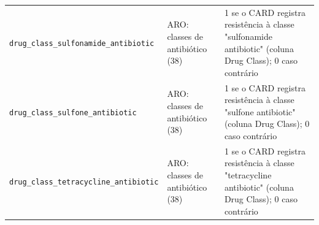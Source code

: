 \begin{longtable}{p{4.2cm}p{2.6cm}p{8cm}}
  \texttt{drug\_class\_sulfonamide\_antibiotic} & ARO: classes de antibiótico (38) & 1 se o CARD registra resistência à classe "sulfonamide antibiotic" (coluna Drug Class); 0 caso contrário \\
  \texttt{drug\_class\_sulfone\_antibiotic} & ARO: classes de antibiótico (38) & 1 se o CARD registra resistência à classe "sulfone antibiotic" (coluna Drug Class); 0 caso contrário \\
  \texttt{drug\_class\_tetracycline\_antibiotic} & ARO: classes de antibiótico (38) & 1 se o CARD registra resistência à classe "tetracycline antibiotic" (coluna Drug Class); 0 caso contrário \\
  \bottomrule
\end{longtable}
